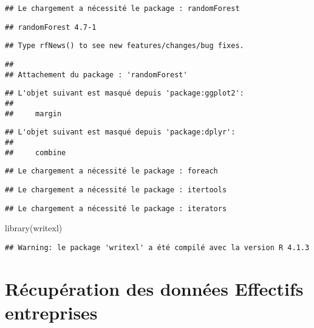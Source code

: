 \documentclass[
]{article}
\newenvironment{Shaded}{\begin{snugshade}}{\end{snugshade}}
\newcommand{\FunctionTok}[1]{\textcolor[rgb]{0.00,0.00,0.00}{#1}}
\newcommand{\NormalTok}[1]{#1}
\begin{document}
\begin{verbatim}
## Le chargement a nécessité le package : randomForest
\end{verbatim}

\begin{verbatim}
## randomForest 4.7-1
\end{verbatim}

\begin{verbatim}
## Type rfNews() to see new features/changes/bug fixes.
\end{verbatim}

\begin{verbatim}
## 
## Attachement du package : 'randomForest'
\end{verbatim}

\begin{verbatim}
## L'objet suivant est masqué depuis 'package:ggplot2':
## 
##     margin
\end{verbatim}

\begin{verbatim}
## L'objet suivant est masqué depuis 'package:dplyr':
## 
##     combine
\end{verbatim}

\begin{verbatim}
## Le chargement a nécessité le package : foreach
\end{verbatim}

\begin{verbatim}
## Le chargement a nécessité le package : itertools
\end{verbatim}

\begin{verbatim}
## Le chargement a nécessité le package : iterators
\end{verbatim}

\begin{Shaded}
\begin{Highlighting}[]
\FunctionTok{library}\NormalTok{(writexl)}
\end{Highlighting}
\end{Shaded}

\begin{verbatim}
## Warning: le package 'writexl' a été compilé avec la version R 4.1.3
\end{verbatim}

\hypertarget{ruxe9cupuxe9ration-des-donnuxe9es-effectifs-entreprises}{%
\section{Récupération des données Effectifs
entreprises}\label{ruxe9cupuxe9ration-des-donnuxe9es-effectifs-entreprises}}
\end{document}
